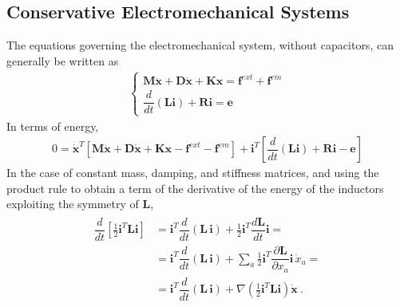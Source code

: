 \documentclass[letterpaper,10pt,english]{jupyterBook}
\begin{document}
\subsection{Conservative Electromechanical Systems}
\label{\detokenize{ch/circuits-electromechanic:conservative-electromechanical-systems}}
\sphinxAtStartPar
The equations governing the electromechanical system, without capacitors, can generally be written as
\begin{equation*}
\begin{split}\begin{cases}
 \mathbf{M} \ddot{\mathbf{x}} + \mathbf{D} \dot{\mathbf{x}} + \mathbf{K} \mathbf{x} = \mathbf{f}^{ext} + \mathbf{f}^{em} \\
 \dfrac{d}{dt} \left( \mathbf{L} \mathbf{i} \right) + \mathbf{R} \mathbf{i} = \mathbf{e}
\end{cases}\end{split}
\end{equation*}
\sphinxAtStartPar
In terms of energy,
\begin{equation*}
\begin{split}
0 = \dot{\mathbf{x}}^T \left[ \mathbf{M} \ddot{\mathbf{x}} + \mathbf{D} \dot{\mathbf{x}} + \mathbf{K} \mathbf{x} - \mathbf{f}^{ext} - \mathbf{f}^{em} \right] + \mathbf{i}^T \left[ \dfrac{d}{dt} \left( \mathbf{L} \mathbf{i} \right) + \mathbf{R} \mathbf{i} - \mathbf{e} \right]
\end{split}
\end{equation*}
\sphinxAtStartPar
In the case of constant mass, damping, and stiffness matrices, and using the product rule to obtain a term of the derivative of the energy of the inductors exploiting the symmetry of \(\mathbf{L}\),
\begin{equation}\label{equation:ch/circuits-electromechanic:classical-electromagnetism:circuits-electromechanic:energy-mech-0}
\begin{split} \begin{aligned}
\dfrac{d}{dt} \left[ \frac{1}{2} \mathbf{i}^T \mathbf{L} \mathbf{i} \right]
  & = \mathbf{i}^T \dfrac{d}{dt} \left( \mathbf{L} \, \mathbf{i} \right) + \frac{1}{2} \mathbf{i}^T \dfrac{d \mathbf{L}}{dt} \mathbf{i} = \\
  & = \mathbf{i}^T \dfrac{d}{dt} \left( \mathbf{L} \, \mathbf{i} \right) + \sum_{a} \frac{1}{2} \mathbf{i}^T \dfrac{\partial \mathbf{L}}{\partial x_a} \mathbf{i} \, \dot{x}_a = \\
  & = \mathbf{i}^T \dfrac{d}{dt} \left( \mathbf{L} \, \mathbf{i} \right) + \nabla \left( \frac{1}{2} \mathbf{i}^T \mathbf{L} \mathbf{i} \right) \dot{\mathbf{x}}  \ .
\end{aligned}\end{split}
\end{equation}
\end{document}
